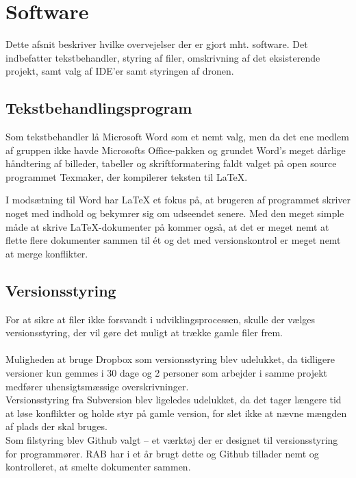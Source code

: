 \documentclass[Main]{subfiles}
\begin{document}
\chapter{Software}
Dette afsnit beskriver hvilke overvejelser der er gjort mht. software.
Det indbefatter tekstbehandler, styring af filer, omskrivning af det eksisterende projekt, samt valg af IDE'er samt styringen af dronen.


\section{Tekstbehandlingsprogram}

Som tekstbehandler lå Microsoft Word som et nemt valg, men da det ene medlem af gruppen ikke havde Microsofts Office-pakken og grundet Word's meget dårlige håndtering af billeder, tabeller og skriftformatering faldt valget på open source programmet Texmaker\cite{Texmaker}, der kompilerer teksten til LaTeX.

I modsætning til Word har LaTeX et fokus på, at brugeren af programmet skriver noget med indhold og bekymrer sig om udseendet senere. 
Med den meget simple måde at skrive LaTeX-dokumenter på kommer også, at det er meget nemt at flette flere dokumenter sammen til ét og det med versionskontrol er meget nemt at merge konflikter.



\section{Versionsstyring}
For at sikre at filer ikke forsvandt i udviklingsprocessen, skulle der vælges  versionsstyring, der vil gøre det muligt at trække gamle filer frem.
\\
\\
Muligheden at bruge Dropbox som versionsstyring blev udelukket, da tidligere versioner kun gemmes i 30 dage\cite{Dropbox} og 2 personer som arbejder i samme projekt medfører uhensigtsmæssige overskrivninger.
\\
Versionsstyring fra Subversion\cite{Subversion} blev ligeledes udelukket, da det tager længere tid at løse konflikter og holde styr på gamle version, for slet ikke at nævne mængden af plads der skal bruges.
\\
Som filstyring blev Github\cite{Github-IHA} valgt -- et værktøj der er designet til versionsstyring for programmører. 
RAB har i et år brugt dette og Github tillader nemt og kontrolleret, at smelte dokumenter sammen.
\end{document}
